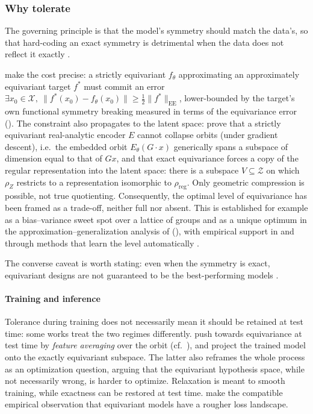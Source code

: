 \documentclass[mathematics,review,submit,moreauthors]{Definitions/mdpi}
\begin{document}
\subsubsection{Why tolerate}\label{sec:approx-why-tolerate}
The governing principle is that the model's symmetry should match the data's, so that hard-coding an exact symmetry is detrimental when the data does not reflect it exactly \citep{zhou2021,finzi2021anips,elsayed2020p3icml}.

\citet{wang2022p3icml} make the cost precise: a strictly equivariant $f_\theta$ approximating an approximately equivariant target $f^*$ must commit an error $\exists x_0\in \mathcal{X},\ \|f^*(x_0)-f_\theta(x_0)\|\ge \tfrac12\|f^*\|_{\mathrm{EE}}$, lower-bounded by the target's own functional symmetry breaking measured in terms of the equivariance error ().
The constraint also propagates to the latent space: \citet{ali2026} prove that a strictly equivariant real-analytic encoder $E$ cannot collapse orbits (under gradient descent), i.e.\ the embedded orbit $E_\theta(G\cdot x)$ generically spans a subspace of dimension equal to that of $G x$, and that exact equivariance forces a copy of the regular representation into the latent space: there is a subspace $V\subseteq\mathcal{Z}$ on which $\rho_Z$ restricts to a representation isomorphic to $\rho_{\mathrm{reg}}$.
Only geometric compression is possible, not true quotienting.
Consequently, the optimal level of equivariance has been framed as a trade-off, neither full nor absent.
This is established for example as a bias--variance sweet spot over a lattice of groups \citep{huang2023} and as a unique optimum in the approximation--generalization analysis of \citet{petrache2023} (), with empirical support in \citep{wang2022p3icml,wang2024p4icml} and through methods that learn the level automatically \citep{ouderaa2022}.

\begin{Remark}
    The converse caveat is worth stating: even when the symmetry is exact, equivariant designs are not guaranteed to be the best-performing models \citep{lawrence2026,rygiel2026}.
\end{Remark}

\paragraph{Training and inference}
Tolerance during training does not necessarily mean it should be retained at test time: some works treat the two regimes differently.
\citet{escriche2025} push towards equivariance at test time by \emph{feature averaging} over the orbit (cf.\ ), and \citet{pertigkiozoglou2024} project the trained model onto the exactly equivariant subspace.
The latter also reframes the whole process as an optimization question, arguing that the equivariant hypothesis space, while not necessarily wrong, is harder to optimize.
Relaxation is meant to smooth training, while exactness can be restored at test time.
\citet{elhag2026} make the compatible empirical observation that equivariant models have a rougher loss landscape.
\end{document}
